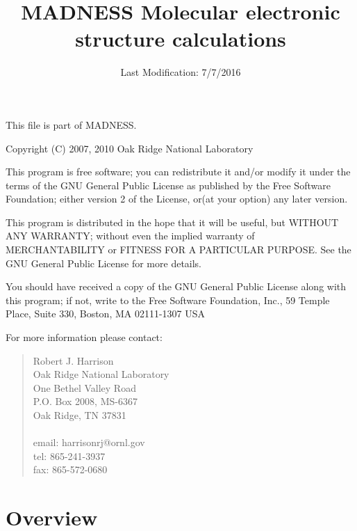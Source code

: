 \documentclass[letterpaper]{book}
\begin{document}
\title{MADNESS Molecular electronic structure calculations}
\date{Last Modification: 7/7/2016}
\maketitle

\pagestyle{empty}
\null\vfill
\noindent
This file is part of MADNESS.


Copyright (C) 2007, 2010 Oak Ridge National Laboratory

This program is free software; you can redistribute it and/or modify it under the terms of the GNU General Public
License as published by the Free Software Foundation; either version 2 of the License, or(at your option) any later
version.

This program is distributed in the hope that it will be useful, but WITHOUT ANY WARRANTY; without even the implied
warranty of MERCHANTABILITY or FITNESS FOR A PARTICULAR PURPOSE. See the GNU General Public License for more details.

You should have received a copy of the GNU General Public License along with this program; if not, write to the Free
Software Foundation, Inc., 59 Temple Place, Suite 330, Boston, MA 02111-1307 USA

For more information please contact:
\begin{quote}							
Robert J. Harrison 				\\
Oak Ridge National Laboratory 	\\
One Bethel Valley Road 			\\
P.O. Box 2008, MS-6367			\\
Oak Ridge, TN 37831				\\
								\\
email: harrisonrj@ornl.gov 		\\
tel: 865-241-3937				\\
fax: 865-572-0680	
\end{quote}		
\newpage


\clearpage
\setcounter{page}{1}

\setcounter{tocdepth}{10}
\renewcommand\contentsname{Table of Contents}
\tableofcontents


\clearpage
\setcounter{page}{1}

\chapter{Overview}
\end{document}
